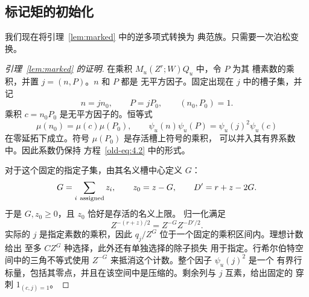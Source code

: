 \documentclass[11pt,a4paper]{article}
\numberwithin{equation}{section}
\numberwithin{figure}{section}
\theoremstyle{definition}
\theoremstyle{remark}
\begin{document}
\subsection{标记矩的初始化}

我们现在将引理~\ref{lem:marked} 中的逆多项式转换为
典范族。只需要一次泊松变换。

\begin{proof}[引理~\ref{lem:marked} 的证明]
在乘积 \(M_u(Z^r;W)Q_u\) 中，令 \(P\) 为其
槽素数的乘积，并置 \(j=(n,P)\)。\(n\) 和 \(P\) 都是
无平方因子。固定出现在 \(j\) 中的槽子集，并记
\[
 n=jn_0,\qquad P=jP_0,\qquad (n_0,P_0)=1.
\]
乘积 \(c=n_0P_0\) 是无平方因子的。恒等式
\[
 \mu(n_0)=\mu(c)\mu(P_0),\qquad
 \psi_u(n)\psi_u(P)=\psi_u(j)^2\psi_u(c)
\]
在零延拓下成立。符号 \(\mu(P_0)\) 是存活槽上符号的乘积，
可以并入其有界系数中。因此系数仍保持
方程~\eqref{old-eq:4.2} 中的形式。

对于这个固定的指定子集，由其名义槽中心定义 \(G\)：
\[
 G=\sum_{i\ {\rm assigned}}z_i,\qquad
 z_0=z-G,\qquad D'=r+z-2G.
\]
于是 \(G,z_0\ge0\)，且 \(z_0\) 恰好是存活的名义上限。
归一化满足
\[
 Z^{-(r+z)/2}=Z^{-G}Z^{-D'/2}.
\]
实际的 \(j\) 是指定素数的乘积，因此
\(q_j/Z^G\) 位于一个固定的乘积区间内。理想计数给出
至多 \(CZ^G\) 种选择，此外还有单独选择的除子损失
用于指定。行希尔伯特空间中的三角不等式使用
\(Z^{-G}\) 来抵消这个计数。整个因子 \(\psi_u(j)^2\) 是一个
有界行标量，包括其零点，并且在该空间中是压缩的。剩余列与 \(j\) 互素，给出固定的
穿刺 \(1_{(c,j)=1}\)。


\end{proof}
\end{document}
